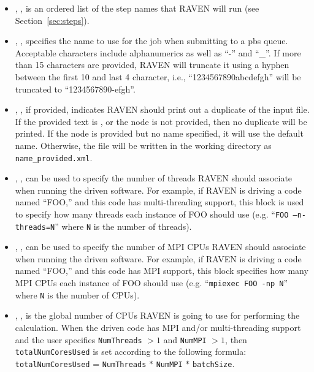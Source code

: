 \begin{itemize}
\item {}, , is
an ordered list of the step names that RAVEN will run (see
Section~\ref{sec:steps}).

\item {}, , specifies
the name to use for the job when submitting to a pbs queue.  Acceptable characters
include alphanumerics as well as ``-'' and ``\_''.  If more than 15
characters are provided, RAVEN will truncate it using a hyphen between the first
10 and last 4 character, i.e., ``1234567890abcdefgh'' will be truncated to
``1234567890-efgh''.
%

\item {}, , if provided, indicates RAVEN should print out a
  duplicate of the input file.  If the provided text is , or the node is not provided, then
  no duplicate will be printed.  If the node is provided but no name specified, it will use the default name.
  Otherwise, the file will be written in the working directory as \texttt{name\_provided.xml}.
%

\item {}, , can be used to
specify the number of threads RAVEN should associate when running the driven
software.
%
For example, if RAVEN is driving a code named ``FOO,'' and this code has
multi-threading support, this block is used to specify how many threads each
instance of FOO should use (e.g. ``\texttt{FOO --n-threads=N}'' where \texttt{N}
 is the number of threads).
%

\item {}, , can be used to
specify the number of MPI CPUs RAVEN should associate when running the driven
software.
%
For example, if RAVEN is driving a code named ``FOO,'' and this code has MPI
support, this block specifies how many MPI CPUs each instance of FOO should use
(e.g. ``\texttt{mpiexec FOO -np N}'' where \texttt{N} is the number of CPUs).
%

\item {}, , is the
global number of CPUs RAVEN is going to use for performing the calculation.
%
When the driven code has MPI and/or multi-threading support and the user
specifies \texttt{NumThreads} $> 1$  and \texttt{NumMPI} $> 1$, then
\texttt{totalNumCoresUsed} is set according to the following formula:\\
\texttt{totalNumCoresUsed} = \texttt{NumThreads} $*$ \texttt{NumMPI} $*$
\texttt{batchSize}.
%


\end{itemize}
